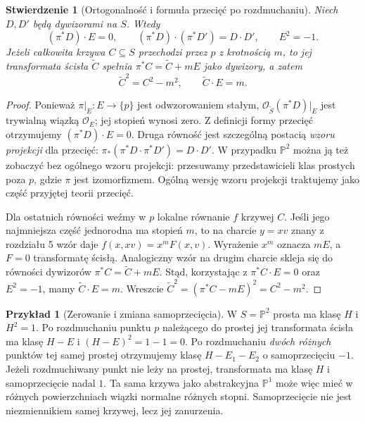 \documentclass[11pt,a4paper,openany]{report}
\numberwithin{equation}{section}
\theoremstyle{plain}
\newtheorem{stwierdzenie}[twierdzenie]{Stwierdzenie}
\theoremstyle{definition}
\newtheorem{przyklad}[twierdzenie]{Przykład}
\theoremstyle{remark}
\newcommand{\PP}{\mathbb P}
\begin{document}
\begin{stwierdzenie}[Ortogonalność i formuła przecięć po rozdmuchaniu]
\label{st:ga6-blowup-form}
Niech $D,D'$ będą dywizorami na $S$. Wtedy
\[
 (\pi^*D)\cdot E=0,\qquad
 (\pi^*D)\cdot(\pi^*D')=D\cdot D',\qquad E^2=-1.
\]
Jeżeli całkowita krzywa $C\subseteq S$ przechodzi
przez $p$ z krotnością $m$, to jej transformata ścisła
$\widetilde C$ spełnia
$\pi^*C=\widetilde C+mE$ jako dywizory, a zatem
\[
 \widetilde C^2=C^2-m^2,\qquad
 \widetilde C\cdot E=m.
\]
\end{stwierdzenie}
\begin{proof}
Ponieważ $\pi|_E:E\to\{p\}$ jest odwzorowaniem stałym,
$\mathcal O_{\widetilde S}(\pi^*D)|_E$
jest trywialną wiązką $\mathcal O_E$;
jej stopień wynosi zero. Z definicji formy przecięć
otrzymujemy $(\pi^*D)\cdot E=0$.
Druga równość jest szczególną postacią \emph{wzoru projekcji}
dla przecięć: $\pi_*(\pi^*D\cdot\pi^*D')=D\cdot D'$.
W przypadku $\PP^2$ można ją też zobaczyć bez ogólnego
wzoru projekcji: przesuwamy przedstawicieli klas
prostych poza $p$, gdzie $\pi$ jest izomorfizmem.
Ogólną wersję wzoru projekcji traktujemy jako część
przyjętej teorii przecięć.

Dla ostatnich równości weźmy w $p$ lokalne równanie
$f$ krzywej $C$. Jeśli jego najmniejsza część
jednorodna ma stopień $m$, to na charcie $y=xv$
znany z rozdziału 5 wzór daje
$f(x,xv)=x^mF(x,v)$. Wyrażenie $x^m$ oznacza $mE$,
a $F=0$ transformatę ścisłą. Analogiczny wzór na drugim
charcie skleja się do równości dywizorów
$\pi^*C=\widetilde C+mE$. Stąd, korzystając z
$\pi^*C\cdot E=0$ oraz $E^2=-1$, mamy
$\widetilde C\cdot E=m$. Wreszcie
$\widetilde C^2=(\pi^*C-mE)^2=C^2-m^2$.
\end{proof}

\begin{przyklad}[Zerowanie i zmiana samoprzecięcia]
\label{prz:ga6-blowup-curves}
W $S=\PP^2$ prosta ma klasę $H$ i $H^2=1$.
Po rozdmuchaniu punktu $p$ należącego do prostej
jej transformata ścisła ma klasę $H-E$ i
$(H-E)^2=1-1=0$. Po rozdmuchaniu \emph{dwóch różnych}
punktów tej samej prostej otrzymujemy klasę
$H-E_1-E_2$ o samoprzecięciu $-1$.
Jeżeli rozdmuchiwany punkt nie leży na prostej,
transformata ma klasę $H$ i samoprzecięcie nadal $1$.
Ta sama krzywa jako abstrakcyjna $\PP^1$ może więc
mieć w różnych powierzchniach wiązki normalne
różnych stopni. Samoprzecięcie nie jest niezmiennikiem
samej krzywej, lecz jej zanurzenia.
\end{przyklad}
\end{document}
